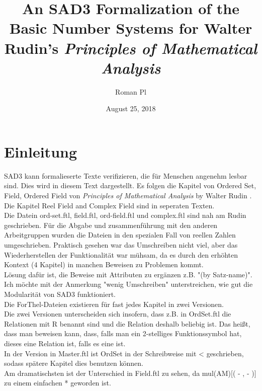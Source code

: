\documentclass{article}
\begin{document}
\title{An SAD3 Formalization of the Basic Number Systems for Walter Rudin's
\it{Principles of Mathematical Analysis}}

\author{Roman Pl}

\date{August 25, 2018}

\maketitle


\section{Einleitung}
SAD3 kann formalieserte Texte verifizieren, die für Menschen angenehm lesbar sind.
Dies wird in diesem Text dargestellt. Es folgen die Kapitel von Ordered Set, Field, Ordered Field von {\it Principles of Mathematical Analysis} by Walter Rudin \cite{Rudin}.\\
Die Kapitel Reel Field and Complex Field sind in seperaten Texten.\\

Die Datein ord-set.ftl, field.ftl, ord-field.ftl und complex.ftl sind nah am Rudin geschrieben. Für die Abgabe und zusammenführung mit den anderen Arbeitgruppen wurden die Dateien in den spezialen Fall von reellen Zahlen umgeschrieben. Praktisch gesehen war das Umschreiben nicht viel, aber das Wiederherstellen der Funktionalität war mühsam, da es durch den erhöhten Kontext (4 Kapitel) in manchen Beweisen zu Problemen kommt.\\
Lösung dafür ist, die Beweise mit Attributen zu ergänzen z.B. "(by Satz-name)".
Ich möchte mit der Anmerkung "wenig Umschreiben" unterstreichen, wie gut die Modularität von SAD3 funktioniert.\\

Die ForThel-Dateien existieren für fast jedes Kapitel in zwei Versionen.\\
Die zwei Versionen unterscheiden sich insofern, dass z.B. in OrdSet.ftl die Relationen mit R benannt sind und die Relation deshalb beliebig ist. Das heißt, dass man beweisen kann, dass, falls man ein 2-stelliges Funktionssymbol hat, dieses eine Relation ist, falls es eine ist.\\
In der Version in Master.ftl ist OrdSet in der Schreibweise mit < geschrieben, sodass spätere Kapitel dies benutzen können.\\

Am dramatischsten ist der Unterschied in Field.ftl zu sehen, da mul(AM)[( - , - )] zu einem einfachen * geworden ist.\\
\end{document}
